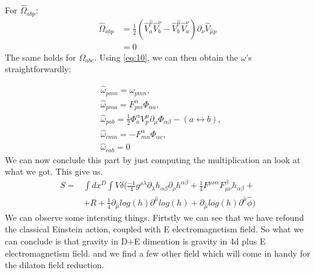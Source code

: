 \documentclass{article}
\begin{document}
For $\hat \Omega_{abp}$:
\begin{align*}
    \hat \Omega_{abp} &= \frac{1}{2}(\hat V^{\hat \mu}_{  a} \hat V^{ \nu}_{b}-\hat V^{\hat \mu}_{b} \hat V^{ \nu}_{a})\partial_{ \nu} \hat V_{\hat \mu p}\\
    &= 0
\end{align*}
The same holds for $\Omega_{abc}$. Using \eqref{eq:10}, we can then obtain the $\omega$'s straightforwardly:

\begin{subequations}
\begin{align}
&\hat\omega_{pmn} = \omega_{pmn},\\
&\hat \omega_{pma} = F^{\alpha}_{pm}\Phi_{\alpha a},\\
&\hat\omega_{pab} = \frac{1}{2}\Phi^\alpha_aV^\mu_p\partial_\mu\Phi_{\alpha \beta} - (a \leftrightarrow b),\\
&\hat\omega_{cmn} = - F^{\alpha}_{mn}\Phi_{\alpha c},\\
&\hat \omega_{cab}  = 0
\end{align}
\end{subequations}
We can now conclude this part by just computing the multiplication an look at what we got. This give us.
\begin{equation}
    \boxed{
    \begin{aligned}
    S = &\int d x^D \int V \delta( 
    \frac{-1}{4} g^{\rho \lambda} \partial_\lambda h_{\alpha \beta}\partial_\rho h^{\alpha \beta}
    +\frac{1}{4}F^{\mu \nu \alpha}F^{\beta}_{\mu  \nu}h_{\alpha \beta}+\\
    &+ R + \frac{1}{4} \partial_{\hat \mu} log(h) \partial^{\hat \mu} log(h) + \partial_{\hat \mu} log(h) \partial^{\hat \mu} \hat \phi )
\end{aligned}}
\end{equation}
We can observe some intersting things. Firtstly we can see that we have refound the classical Einstein action, coupled with E electromagnetism field. So what we can conclude is that gravity in D+E dimention is gravity in 4d plus E electromagnetism field.
and we find a few other field which will come in handy for the dilaton field reduction.
\end{document}
